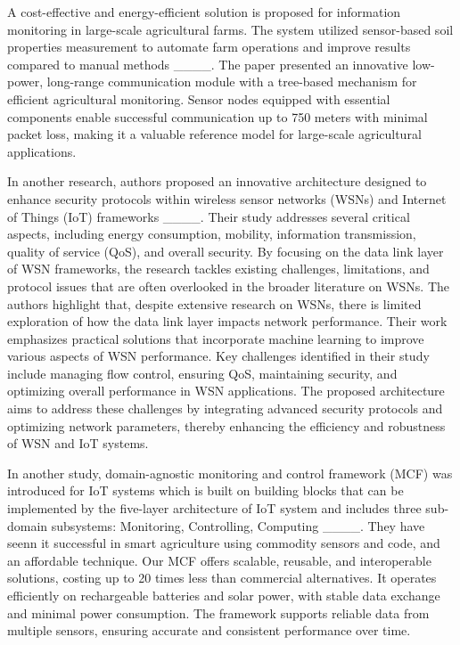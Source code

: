 A cost-effective and energy-efficient solution is proposed for information monitoring in large-scale agricultural farms. The system utilized sensor-based soil properties measurement to automate farm operations and improve results compared to manual methods ____. The paper presented an innovative low-power, long-range communication module with a tree-based mechanism for efficient agricultural monitoring. Sensor nodes equipped with essential components enable successful communication up to 750 meters with minimal packet loss, making it a valuable reference model for large-scale agricultural applications.

In another research, authors proposed an innovative architecture designed to enhance security protocols within wireless sensor networks (WSNs) and Internet of Things (IoT) frameworks ____. Their study addresses 
several critical aspects, including energy consumption, mobility, information transmission, quality of service (QoS), and overall security. By 
focusing on the data link layer of WSN frameworks, the research tackles existing challenges, limitations, and protocol issues that are often overlooked in the broader literature on WSNs. The authors highlight that, despite extensive research on WSNs, there is limited exploration of how the data link layer impacts network performance. Their work emphasizes practical solutions that incorporate machine learning to improve various aspects of WSN performance. Key challenges identified in their study include managing flow control, ensuring QoS, maintaining security, and optimizing overall performance in WSN applications. The proposed architecture aims to address these challenges by integrating advanced security protocols and optimizing network parameters, thereby enhancing the efficiency and robustness of WSN and IoT systems.

In another study, domain-agnostic monitoring and control framework (MCF) was introduced for IoT systems which is built on building blocks that can be implemented by the five-layer architecture of IoT system and includes three sub-domain subsystems: Monitoring, Controlling, Computing ____. They have seenn it successful in smart agriculture using commodity sensors and code, and an affordable technique. Our MCF offers scalable, reusable, and interoperable solutions, costing up to 20 times less than commercial alternatives. It operates efficiently on rechargeable batteries and solar power, with stable data exchange and minimal power consumption. The framework supports reliable data from multiple sensors, ensuring accurate and consistent performance over time.

